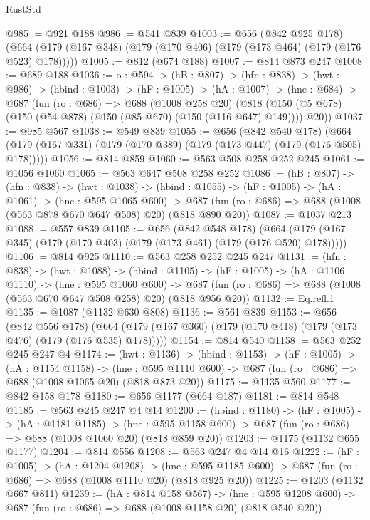 \begin{lexlean}{RustStd}
\begin{coremodule}
{\begin{coremodule}
@985 := @921 @188
@986 := @541 @839
@1003 := @656
    (@842 @925 @178)
    (@664 (@179 (@167 @348) (@179 (@170 @406) (@179 (@173 @464) (@179 (@176 @523) @178)))))
@1005 := @812 (@674 @188)
@1007 := @814 @873 @247
@1008 := @689 @188
@1036 := {o : @594} ->
  (hB : @807) ->
  (hfn : @838) ->
  (hwt : @986) ->
  (hbind : @1003) ->
  (hF : @1005) ->
  (hA : @1007) ->
  (hne : @684) ->
  @687
    (fun (ro : @686) =>
    @688
      (@1008 @258 @20)
      (@818 (@150 (@5 @678) (@150 (@54 @878) (@150 (@85 @670) (@150 (@116 @647) @149)))) @20))
@1037 := @985 @567
@1038 := @549 @839
@1055 := @656
    (@842 @540 @178)
    (@664 (@179 (@167 @331) (@179 (@170 @389) (@179 (@173 @447) (@179 (@176 @505) @178)))))
@1056 := @814 @859
@1060 := @563 @508 @258 @252 @245
@1061 := @1056 @1060
@1065 := @563 @647 @508 @258 @252
@1086 := (hB : @807) ->
  (hfn : @838) ->
  (hwt : @1038) ->
  (hbind : @1055) ->
  (hF : @1005) ->
  (hA : @1061) ->
  (hne : @595 @1065 @600) ->
  @687 (fun (ro : @686) => @688 (@1008 (@563 @878 @670 @647 @508) @20) (@818 @890 @20))
@1087 := @1037 @213
@1088 := @557 @839
@1105 := @656
    (@842 @548 @178)
    (@664 (@179 (@167 @345) (@179 (@170 @403) (@179 (@173 @461) (@179 (@176 @520) @178)))))
@1106 := @814 @925
@1110 := @563 @258 @252 @245 @247
@1131 := (hfn : @838) ->
  (hwt : @1088) ->
  (hbind : @1105) ->
  (hF : @1005) ->
  (hA : @1106 @1110) ->
  (hne : @595 @1060 @600) ->
  @687 (fun (ro : @686) => @688 (@1008 (@563 @670 @647 @508 @258) @20) (@818 @956 @20))
@1132 := Eq.refl.{1}
@1135 := @1087 (@1132 @630 @808)
@1136 := @561 @839
@1153 := @656
    (@842 @556 @178)
    (@664 (@179 (@167 @360) (@179 (@170 @418) (@179 (@173 @476) (@179 (@176 @535) @178)))))
@1154 := @814 @540
@1158 := @563 @252 @245 @247 @4
@1174 := (hwt : @1136) ->
  (hbind : @1153) ->
  (hF : @1005) ->
  (hA : @1154 @1158) ->
  (hne : @595 @1110 @600) -> @687 (fun (ro : @686) => @688 (@1008 @1065 @20) (@818 @873 @20))
@1175 := @1135 @560
@1177 := @842 @158 @178
@1180 := @656 @1177 (@664 @187)
@1181 := @814 @548
@1185 := @563 @245 @247 @4 @14
@1200 := (hbind : @1180) ->
  (hF : @1005) ->
  (hA : @1181 @1185) ->
  (hne : @595 @1158 @600) -> @687 (fun (ro : @686) => @688 (@1008 @1060 @20) (@818 @859 @20))
@1203 := @1175 (@1132 @655 @1177)
@1204 := @814 @556
@1208 := @563 @247 @4 @14 @16
@1222 := (hF : @1005) ->
  (hA : @1204 @1208) ->
  (hne : @595 @1185 @600) -> @687 (fun (ro : @686) => @688 (@1008 @1110 @20) (@818 @925 @20))
@1225 := @1203 (@1132 @667 @811)
@1239 := (hA : @814 @158 @567) ->
  (hne : @595 @1208 @600) -> @687 (fun (ro : @686) => @688 (@1008 @1158 @20) (@818 @540 @20))

\end{coremodule}}
\end{coremodule}
\end{lexlean}
